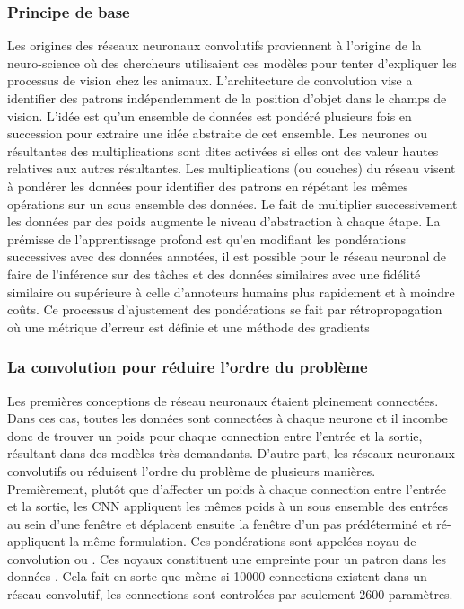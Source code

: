     \subsubsection{Principe de base}
    Les origines des réseaux neuronaux convolutifs proviennent à l'origine de la neuro-science où des chercheurs utilisaient ces modèles pour tenter d'expliquer les processus de vision \parencite{Fukushima:NeocognitronSelforganizing:1980} chez les animaux. L'architecture de convolution vise a identifier des patrons indépendemment de la position d'objet dans le champs de vision. L'idée est qu'un ensemble de données est pondéré plusieurs fois en succession pour extraire une idée abstraite de cet ensemble. Les neurones ou résultantes des multiplications sont dites activées si elles ont des valeur hautes relatives aux autres résultantes. Les multiplications (ou couches) du réseau visent à pondérer les données pour identifier des patrons en répétant les mêmes opérations sur un sous ensemble des données. Le fait de multiplier successivement les données par des poids augmente le niveau d'abstraction à chaque étape. La prémisse de l'apprentissage profond est qu'en modifiant les pondérations successives avec des données annotées, il est possible pour le réseau neuronal de faire de l'inférence sur des tâches et des données similaires avec une fidélité similaire ou supérieure à celle d'annoteurs humains plus rapidement et à moindre coûts. Ce processus d'ajustement des pondérations se fait par rétropropagation où une métrique d'erreur est définie et une méthode des gradients \parencite{Rumelhart:LearningRepresentations:1986}\par
     \subsubsection{La convolution pour réduire l'ordre du problème}
    Les premières conceptions de réseau neuronaux étaient pleinement connectées. Dans ces cas, toutes les données sont connectées à chaque neurone et il incombe donc de trouver un poids pour chaque connection entre l'entrée et la sortie, résultant dans des modèles très demandants. D'autre part,  les réseaux neuronaux convolutifs ou \fg{} réduisent l'ordre du problème de plusieurs manières. Premièrement, plutôt que d'affecter un poids à chaque connection entre l'entrée et la sortie, les \ac{CNN} appliquent les mêmes poids à un sous ensemble des entrées au sein d'une fenêtre et déplacent ensuite la fenêtre d'un pas prédéterminé et ré-appliquent la même formulation. Ces pondérations sont appelées noyau de convolution ou  \fg. Ces noyaux constituent une empreinte pour un patron dans les données \parencite{Lecun:ConvolutionalNetworks:1995}. Cela fait en sorte que même si 10000 connections existent dans un réseau convolutif, les connections sont controlées par seulement 2600 paramètres.\par
